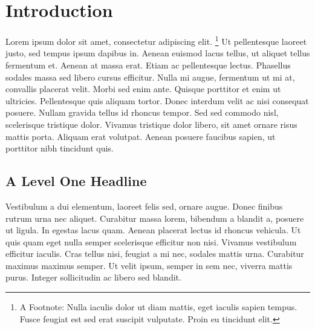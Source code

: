 



\frontmatter
{}




\tableofcontents
\cleardoublepage
\cfoot*{}
\ofoot*{\pagemark}
\mainmatter

\hypertarget{introduction}{%
\chapter{Introduction}\label{introduction}}

Lorem ipsum dolor sit amet, consectetur adipiscing elit. \footnote{A
  Footnote: Nulla iaculis dolor ut diam mattis, eget iaculis sapien
  tempus. Fusce feugiat est sed erat suscipit vulputate. Proin eu
  tincidunt elit.} Ut pellentesque laoreet justo, sed tempus ipsum
dapibus in. Aenean euismod lacus tellus, ut aliquet tellus fermentum et.
Aenean at massa erat. Etiam ac pellentesque lectus. Phasellus sodales
massa sed libero cursus efficitur. Nulla mi augue, fermentum ut mi at,
convallis placerat velit. Morbi sed enim ante. Quisque porttitor et enim
ut ultricies. Pellentesque quis aliquam tortor. Donec interdum velit ac
nisi consequat posuere. Nullam gravida tellus id rhoncus tempor. Sed sed
commodo nisl, scelerisque tristique dolor. Vivamus tristique dolor
libero, sit amet ornare risus mattis porta. Aliquam erat volutpat.
Aenean posuere faucibus sapien, ut porttitor nibh tincidunt
quis.\citep{examplearticle2021}

\hypertarget{a-level-one-headline}{%
\section{A Level One Headline}\label{a-level-one-headline}}

Vestibulum a dui elementum, laoreet felis sed, ornare augue. Donec
finibus rutrum urna nec aliquet. Curabitur massa lorem, bibendum a
blandit a, posuere ut ligula. In egestas lacus quam. Aenean placerat
lectus id rhoncus vehicula. Ut quis quam eget nulla semper scelerisque
efficitur non nisi. Vivamus vestibulum efficitur iaculis. Cras tellus
nisi, feugiat a mi nec, sodales mattis urna. Curabitur maximus maximus
semper. Ut velit ipsum, semper in sem nec, viverra mattis purus. Integer
sollicitudin ac libero sed blandit.

